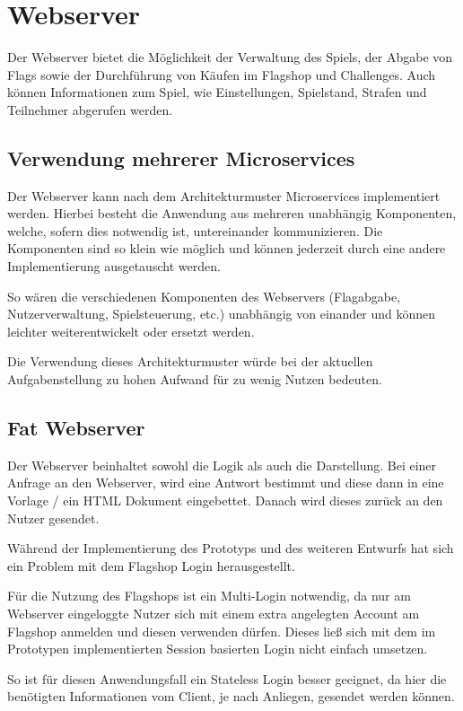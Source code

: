 \section{Webserver} \label{sec:Webserver}
Der Webserver bietet die Möglichkeit der Verwaltung des Spiels, der Abgabe von Flags sowie der Durchführung von Käufen im Flagshop und Challenges. Auch können Informationen zum Spiel, wie Einstellungen, Spielstand, Strafen und Teilnehmer abgerufen werden.

\subsection{Verwendung mehrerer Microservices}
Der Webserver kann nach dem Architekturmuster Microservices implementiert werden. Hierbei besteht die Anwendung aus mehreren unabhängig Komponenten, welche, sofern dies notwendig ist, untereinander kommunizieren. Die Komponenten sind so klein wie möglich und können jederzeit durch eine andere Implementierung ausgetauscht werden. \cite{wolffMicroservicesGrundlagenFlexibler2015} 

So wären die verschiedenen Komponenten des Webservers (Flagabgabe, Nutzerverwaltung, Spielsteuerung, etc.) unabhängig von einander und können leichter weiterentwickelt oder ersetzt werden.

Die Verwendung dieses Architekturmuster würde bei der aktuellen Aufgabenstellung zu hohen Aufwand für zu wenig Nutzen bedeuten.

\subsection{Fat Webserver}
Der Webserver beinhaltet sowohl die Logik als auch die Darstellung. Bei einer Anfrage an den Webserver, wird eine Antwort bestimmt und diese dann in eine Vorlage / ein HTML Dokument eingebettet. Danach wird dieses zurück an den Nutzer gesendet.

Während der Implementierung des Prototyps und des weiteren Entwurfs hat sich ein Problem mit dem Flagshop Login herausgestellt.

Für die Nutzung des Flagshops ist ein Multi-Login notwendig, da nur am Webserver eingeloggte Nutzer sich mit einem extra angelegten Account am Flagshop anmelden und diesen verwenden dürfen. Dieses ließ sich mit dem im Prototypen implementierten Session basierten Login nicht einfach umsetzen. 

So ist für diesen Anwendungsfall ein Stateless Login besser geeignet, da hier die benötigten Informationen vom Client, je nach Anliegen, gesendet werden können. 

